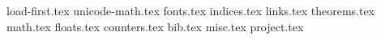 
{load-first.tex}
{unicode-math.tex}
{fonts.tex}
{indices.tex}
{links.tex}
{theorems.tex}
{math.tex}
{floats.tex}
{counters.tex}
{bib.tex}
{misc.tex}
{project.tex}

